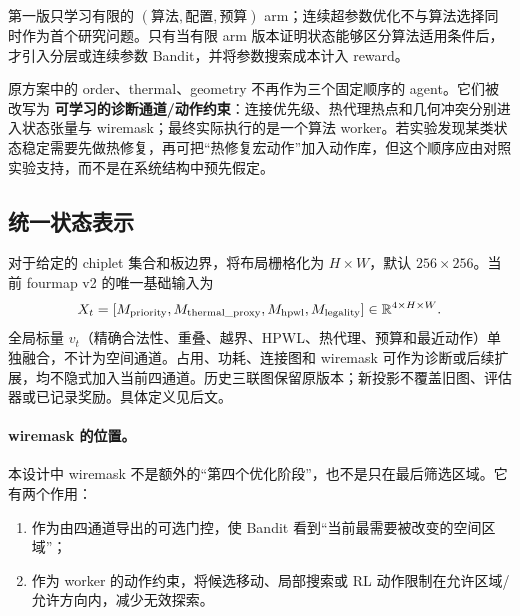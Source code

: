 \documentclass[UTF8,a4paper,11pt]{ctexart}
\begin{document}
\begin{tcolorbox}[colback=lightorange,colframe=orange!70!black,title=实验边界]
第一版只学习有限的 \((\text{算法},\text{配置},\text{预算})\) arm；连续超参数优化不与算法选择同时作为首个研究问题。只有当有限 arm 版本证明状态能够区分算法适用条件后，才引入分层或连续参数 Bandit，并将参数搜索成本计入 reward。
\end{tcolorbox}

\begin{tcolorbox}[colback=lightorange,colframe=orange!70!black,title=与原多阶段 Agent 方案的关系]
原方案中的 order、thermal、geometry 不再作为三个固定顺序的 agent。它们被改写为 \textbf{可学习的诊断通道/动作约束}：连接优先级、热代理热点和几何冲突分别进入状态张量与 wiremask；最终实际执行的是一个算法 worker。若实验发现某类状态稳定需要先做热修复，再可把“热修复宏动作”加入动作库，但这个顺序应由对照实验支持，而不是在系统结构中预先假定。
\end{tcolorbox}

\subsection{统一状态表示}

对于给定的 chiplet 集合和板边界，将布局栅格化为 $H\times W$，默认 $256\times256$。当前 fourmap v2 的唯一基础输入为
\begin{equation}
X_t=[M_{\rm priority},M_{\rm thermal\_proxy},M_{\rm hpwl},M_{\rm legality}]
\in\mathbb{R}^{4\times H\times W}.
\end{equation}
全局标量 $v_t$（精确合法性、重叠、越界、HPWL、热代理、预算和最近动作）单独融合，不计为空间通道。占用、功耗、连接图和 wiremask 可作为诊断或后续扩展，均不隐式加入当前四通道。历史三联图保留原版本；新投影不覆盖旧图、评估器或已记录奖励。具体定义见后文。

\paragraph{wiremask 的位置。} 本设计中 wiremask 不是额外的“第四个优化阶段”，也不是只在最后筛选区域。它有两个作用：

\begin{enumerate}
    \item 作为由四通道导出的可选门控，使 Bandit 看到“当前最需要被改变的空间区域”；
    \item 作为 worker 的动作约束，将候选移动、局部搜索或 RL 动作限制在允许区域/允许方向内，减少无效探索。
\end{enumerate}
\end{document}
